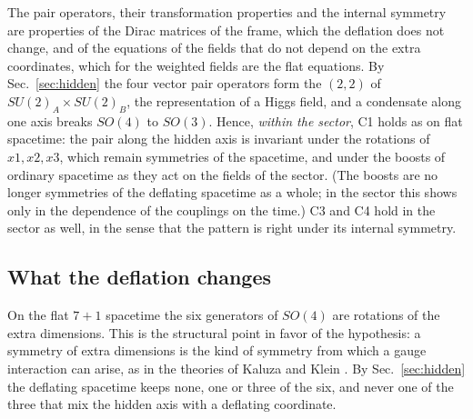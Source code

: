 The pair operators, their transformation properties and the internal symmetry are properties of the
Dirac matrices of the frame, which the deflation does not change, and of the equations of the fields
that do not depend on the extra coordinates, which for the weighted fields are the flat equations.
By Sec.~\ref{sec:hidden} the four vector pair operators form the $(2,2)$ of
$SU(2)_A\times SU(2)_B$, the representation of a Higgs field, and a condensate along one axis breaks
$SO(4)$ to $SO(3)$. Hence, \emph{within the sector}, C1 holds as on flat spacetime: the pair along
the hidden axis is invariant under the rotations of $x1,x2,x3$, which remain symmetries of the
spacetime, and under the boosts of ordinary spacetime as they act on the fields of the sector. (The
boosts are no longer symmetries of the deflating spacetime as a whole; in the sector this shows only
in the dependence of the couplings on the time.) C3 and C4 hold in the sector as well, in the sense
that the pattern is right under its internal symmetry.

\subsection{What the deflation changes}

On the flat $7+1$ spacetime the six generators of $SO(4)$ are rotations of the extra dimensions. This
is the structural point in favor of the hypothesis: a symmetry of extra dimensions is the
kind of symmetry from which a gauge interaction can arise, as in the theories of Kaluza and Klein
\cite{Witten1981}. By Sec.~\ref{sec:hidden} the deflating spacetime keeps none, one or three of the
six, and never one of the three that mix the hidden axis with a deflating coordinate.

